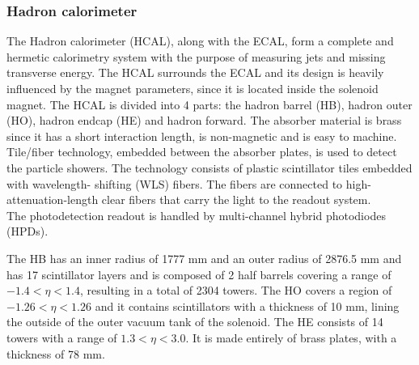 \subsubsection*{Hadron calorimeter}
The Hadron calorimeter (HCAL), along with the ECAL, form a complete and hermetic calorimetry system  with the purpose of measuring  jets and missing transverse energy. The HCAL surrounds the ECAL and its design is heavily influenced by the magnet parameters, since it is located inside the solenoid magnet. The HCAL is divided into 4 parts: the hadron barrel (HB), hadron outer (HO), hadron endcap (HE) and hadron forward. The absorber material is brass since it has a short interaction length, is non-magnetic and is easy to machine. Tile/fiber technology, embedded between the absorber plates, is used to detect the particle showers. The technology consists of plastic scintillator tiles embedded with  wavelength- shifting (WLS) fibers. The fibers are connected to high-attenuation-length clear fibers that carry the light to the readout system.\\
The photodetection readout is handled by multi-channel hybrid photodiodes (HPDs).

The HB has an inner radius of 1777 mm and an outer radius of 2876.5 mm and has 17 scintillator layers and is composed of 2 half barrels covering a range of  $-1.4<\eta<1.4$, resulting in a total of 2304 towers.
The HO covers a region of $-1.26<\eta<1.26$ and it contains scintillators with a thickness of 10 mm, lining the outside of the outer vacuum tank of the solenoid. The HE consists of 14 towers with a range of $1.3<\eta<3.0$. It is made entirely of brass plates, with a thickness of 78 mm.

